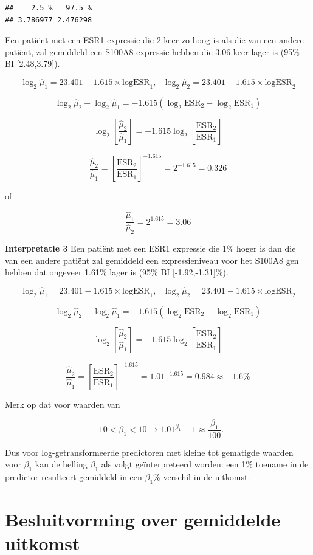 \documentclass[
  12pt,dutch]{book}
\theoremstyle{definition}
\theoremstyle{definition}
\theoremstyle{definition}
\theoremstyle{definition}
\theoremstyle{remark}
\begin{document}
\begin{verbatim}
##    2.5 %   97.5 % 
## 3.786977 2.476298
\end{verbatim}

Een patiënt met een ESR1 expressie die 2 keer zo hoog is als die van een andere patiënt, zal gemiddeld een S100A8-expressie hebben die 3.06 keer lager is (95\% BI {[}2.48,3.79{]}).

\[\log_2 \hat\mu_1=23.401  -1.615 \times \text{logESR}_1,\text{ } \log_2 \hat\mu_2=23.401  -1.615 \times \text{logESR}_2 \]

\[\log_2 \hat\mu_2-\log_2 \hat\mu_1=  -1.615 (\log_2 \text{ESR}_2-\log_2 \text{ESR}_1) \]

\[\log_2 \left[\frac{\hat\mu_2}{\hat\mu_1}\right]=  -1.615 \log_2\left[\frac{ \text{ESR}_2}{\text{ESR}_1}\right] \]

\[\frac{\hat\mu_2}{\hat\mu_1}=\left[\frac{ \text{ESR}_2}{\text{ESR}_1}\right]^{-1.615}=2^ {-1.615} =0.326\]

of

\[\frac{\hat\mu_1}{\hat\mu_2}=2^{1.615} =3.06\]

\textbf{Interpretatie 3}
Een patiënt met een ESR1 expressie die 1\% hoger is dan die van een andere patiënt zal gemiddeld een expressieniveau voor het S100A8 gen hebben dat ongeveer 1.61\% lager is (95\% BI {[}-1.92,-1.31{]}\%).

\[\log_2 \hat\mu_1=23.401  -1.615 \times \text{logESR}_1,\text{ } \log_2 \hat\mu_2=23.401  -1.615 \times \text{logESR}_2 \]

\[\log_2 \hat\mu_2-\log_2 \hat \mu_1=  -1.615 (\log_2 \text{ESR}_2-\log_2 \text{ESR}_1) \]

\[\log_2 \left[\frac{\hat\mu_2}{\hat\mu_1}\right]=  -1.615 \log_2\left[\frac{ \text{ESR}_2}{\text{ESR}_1}\right] \]

\[\frac{\hat\mu_2}{\hat\mu_1}=\left[\frac{ \text{ESR}_2}{\text{ESR}_1}\right]^{-1.615}=1.01^ {-1.615} =0.984 \approx -1.6\%\]

Merk op dat voor waarden van

\[−10< \beta_1<10 \rightarrow 1.01 ^{\beta_1}−1 \approx \frac{\beta_1}{100}.\]

Dus voor log-getransformeerde predictoren met kleine tot gematigde waarden voor \(\beta_1\) kan de helling \(\beta_1\) als volgt geïnterpreteerd worden: een 1\% toename in de predictor resulteert gemiddeld in een \(\beta_1\)\% verschil in de uitkomst.

\section{Besluitvorming over gemiddelde uitkomst}\label{besluitvorming-over-gemiddelde-uitkomst}
\end{document}
